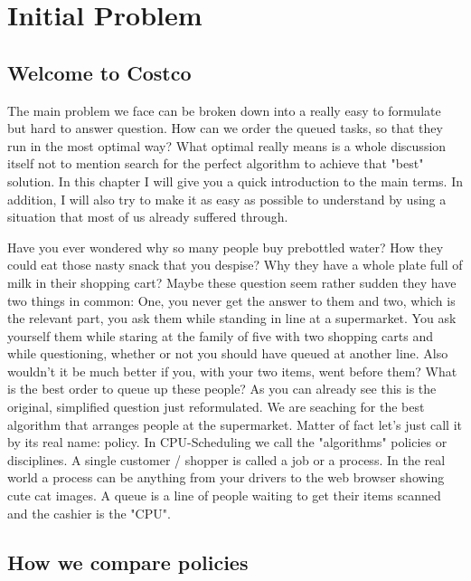 \chapter{Initial Problem}

\section{Welcome to Costco}

The main problem we face can be broken down into a really easy to formulate but hard to answer question.
How can we order the queued tasks, so that they run in the most optimal way?
What optimal really means is a whole discussion itself not to mention search for the perfect algorithm to achieve that "best" solution.
In this chapter I will give you a quick introduction to the main terms.
In addition, I will also try to make it as easy as possible to understand by using a situation that most of us already suffered through.

Have you ever wondered why so many people buy prebottled water? 
How they could eat those nasty snack that you despise?
Why they have a whole plate full of milk in their shopping cart?
Maybe these question seem rather sudden they have two things in common:
One, you never get the answer to them and two, which is the relevant part, you ask them while standing in line at a supermarket.
You ask yourself them while staring at the family of five with two shopping carts and while questioning, whether or not you should have queued at another line.
Also wouldn't it be much better if you, with your two items, went before them?
What is the best order to queue up these people?
As you can already see this is the original, simplified question just reformulated.
We are seaching for the best algorithm that arranges people at the supermarket.
Matter of fact let's just call it by its real name: policy.
In CPU-Scheduling we call the "algorithms" policies or disciplines.
A single customer / shopper is called a job or a process.
In the real world a process can be anything from your drivers to the web browser showing cute cat images.
A queue is a line of people waiting to get their items scanned and the cashier is the "CPU".



\section{How we compare policies}

